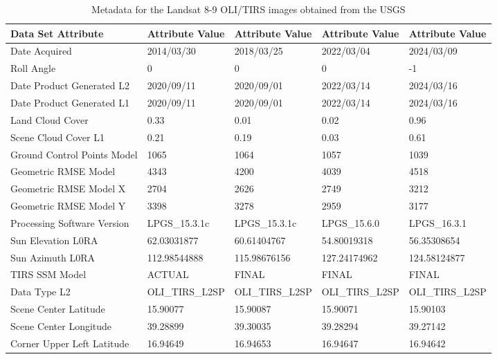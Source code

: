 \documentclass[sn-mathphys-num]{sn-jnl}%
\theoremstyle{thmstyleone}%
\theoremstyle{thmstyletwo}%
\theoremstyle{thmstylethree}%
\begin{document}
\begin{table}[h]
\footnotesize
\caption{Metadata for the Landsat 8-9 OLI/TIRS images obtained from the USGS}\label{AppA}
    \begin{tabular}{@{}|l|l|l|l|l|@{}}
    \toprule
    Data Set Attribute & Attribute Value & Attribute Value & Attribute Value & Attribute Value \\ 
	\midrule
        Date Acquired & 2014/03/30 & 2018/03/25 & 2022/03/04 & 2024/03/09\\
       Roll Angle & 0 & 0 & 0 & -1\\
        Date Product Generated L2 & 2020/09/11 & 2020/09/01 & 2022/03/14 & 2024/03/16\\
        Date Product Generated L1 & 2020/09/11 & 2020/09/01 & 2022/03/14 & 2024/03/16\\
        Land Cloud Cover & 0.33 & 0.01 & 0.02 & 0.96\\
        Scene Cloud Cover L1 & 0.21 & 0.19 & 0.03 & 0.61\\
        Ground Control Points Model & 1065 & 1064 & 1057 & 1039\\
        Geometric RMSE Model & 4343 & 4200 & 4039 & 4518\\
        Geometric RMSE Model X & 2704 & 2626 & 2749 & 3212\\
        Geometric RMSE Model Y & 3398 & 3278 & 2959 & 3177\\
        Processing Software Version & LPGS\_15.3.1c & LPGS\_15.3.1c & LPGS\_15.6.0 & LPGS\_16.3.1\\
        Sun Elevation L0RA & 62.03031877 & 60.61404767 & 54.80019318 & 56.35308654\\
        Sun Azimuth L0RA & 112.98544888 & 115.98676156 & 127.24174962 & 124.58124877\\
        TIRS SSM Model & ACTUAL & FINAL & FINAL & FINAL\\
        Data Type L2 & OLI\_TIRS\_L2SP & OLI\_TIRS\_L2SP & OLI\_TIRS\_L2SP & OLI\_TIRS\_L2SP\\
        Scene Center Latitude & 15.90077 & 15.90087 & 15.90071 & 15.90103\\
        Scene Center Longitude & 39.28899 & 39.30035 & 39.28294 & 39.27142\\
        Corner Upper Left Latitude & 16.94649 & 16.94653 & 16.94647 & 16.94642\\

\end{tabular}
\end{table}
\end{document}
